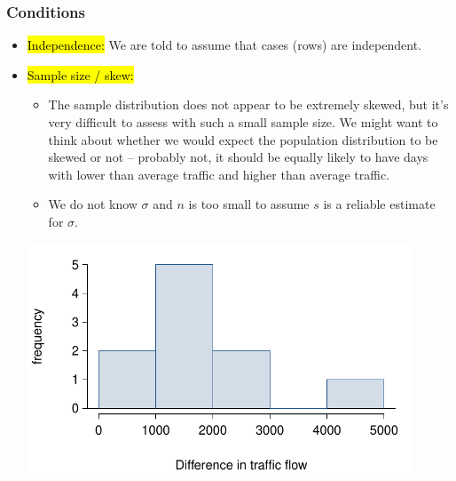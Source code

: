 \documentclass[notes,11pt, aspectratio=169]{beamer}
\begin{document}

\begin{frame}
\frametitle{Conditions}

\begin{itemize}

\item \hl{Independence:} We are told to assume that cases (rows) are independent.

\pause

\item \hl{Sample size / skew:} $\:$ \\

\pause

{
{\tiny
\begin{itemize}

\item The sample distribution does not appear to be extremely skewed, but it's very difficult to assess with such a small sample size. We might want to think about whether we would expect the population distribution to be skewed or not -- probably not, it should be equally likely to have days with lower than average traffic and higher than average traffic.

\item We do not know $\sigma$ and $n$ is too small to assume $s$ is a reliable estimate for $\sigma$.
\end{itemize}
}
}
{
\includegraphics[width=0.9\textwidth]{graphs/trafficHist}
}

\end{itemize}

$\:$ \\

\pause


\end{frame}
\end{document}
